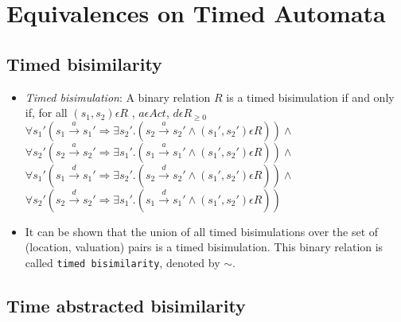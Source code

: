 \documentclass{article}
\begin{document}
  \section{Equivalences on Timed Automata}

  \subsection{Timed bisimilarity}
  
  \begin{itemize}
  \item \emph{Timed bisimulation}: A binary relation $R$ is a timed
    bisimulation if and only if, for all $(s_1, s_2) \epsilon R$ , $a \epsilon Act $, $d \epsilon R_{\ge 0}$\\
    $\forall s_1' (s_1 \xrightarrow{a} s_1' \Rightarrow \exists s_2'
    . (s_2 \xrightarrow{a} s_2' \wedge (s_1', s_2') \epsilon R ) )
    \wedge $ \\
    $\forall s_2' (s_2 \xrightarrow{a} s_2' \Rightarrow \exists s_1'
    . (s_1 \xrightarrow{a} s_1' \wedge (s_1', s_2') \epsilon R ) ) \wedge $ \\
    $\forall s_1' (s_1 \xrightarrow{d} s_1' \Rightarrow \exists s_2'
    . (s_2 \xrightarrow{d} s_2' \wedge (s_1', s_2') \epsilon R ) )
    \wedge $ \\
    $\forall s_2' (s_2 \xrightarrow{d} s_2' \Rightarrow \exists s_1'
    . (s_1 \xrightarrow{d} s_1' \wedge (s_1', s_2') \epsilon R ) ) $ \\
    
  \item It can be shown that the union of all timed bisimulations
    over the set of (location, valuation) pairs is a timed bisimulation. This binary
    relation is called \texttt{timed bisimilarity}, denoted by $\sim$.
  \end{itemize}
  
  \subsection{Time abstracted bisimilarity}
  
\end{document}
